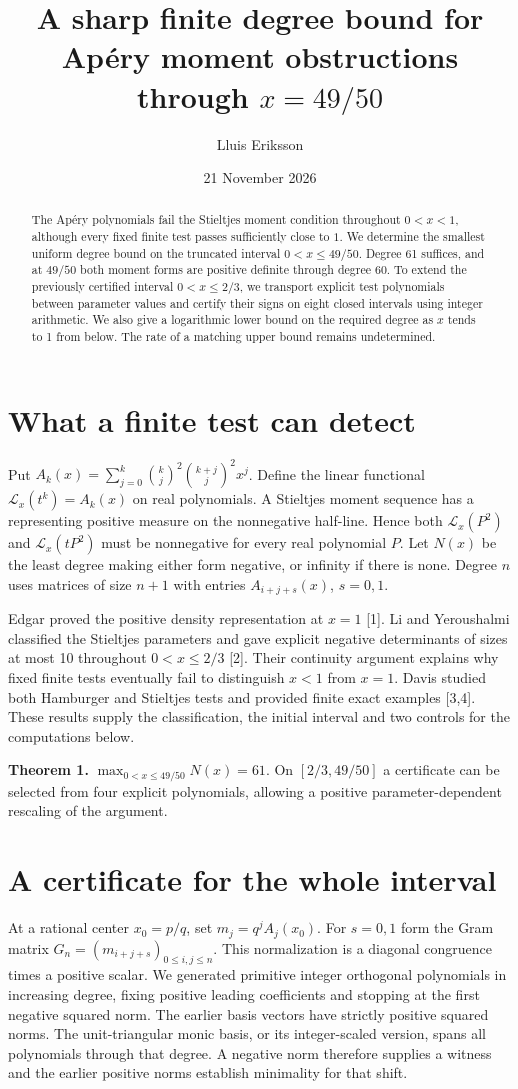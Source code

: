 \documentclass[11pt]{article}
\title{A sharp finite degree bound for Ap\'ery moment obstructions through \(x=49/50\)}
\author{Lluis Eriksson}
\date{21 November 2026}
\newcommand{\A}{A}\newcommand{\Lx}{\mathcal L_x}
\begin{document}
\maketitle
\begin{abstract}
The Ap\'ery polynomials fail the Stieltjes moment condition throughout \(0<x<1\), although every fixed finite test passes sufficiently close to \(1\). We determine the smallest uniform degree bound on the truncated interval \(0<x\le49/50\). Degree 61 suffices, and at \(49/50\) both moment forms are positive definite through degree 60. To extend the previously certified interval \(0<x\le2/3\), we transport explicit test polynomials between parameter values and certify their signs on eight closed intervals using integer arithmetic. We also give a logarithmic lower bound on the required degree as \(x\) tends to 1 from below. The rate of a matching upper bound remains undetermined.
\end{abstract}
\section{What a finite test can detect}
Put \(\A_k(x)=\sum_{j=0}^k {k\choose j}^2{k+j\choose j}^2 x^j\). Define the linear functional \(\Lx(t^k)=\A_k(x)\) on real polynomials. A Stieltjes moment sequence has a representing positive measure on the nonnegative half-line. Hence both \(\Lx(P^2)\) and \(\Lx(tP^2)\) must be nonnegative for every real polynomial \(P\). Let \(N(x)\) be the least degree making either form negative, or infinity if there is none. Degree \(n\) uses matrices of size \(n+1\) with entries \(\A_{i+j+s}(x)\), \(s=0,1\).

Edgar proved the positive density representation at \(x=1\) [1]. Li and Yeroushalmi classified the Stieltjes parameters and gave explicit negative determinants of sizes at most 10 throughout \(0<x\le2/3\) [2]. Their continuity argument explains why fixed finite tests eventually fail to distinguish \(x<1\) from \(x=1\). Davis studied both Hamburger and Stieltjes tests and provided finite exact examples [3,4]. These results supply the classification, the initial interval and two controls for the computations below.

\textbf{Theorem 1.} \(\max_{0<x\le49/50}N(x)=61\). On \([2/3,49/50]\) a certificate can be selected from four explicit polynomials, allowing a positive parameter-dependent rescaling of the argument.
\newpage
\section{A certificate for the whole interval}
At a rational center \(x_0=p/q\), set \(m_j=q^j\A_j(x_0)\). For \(s=0,1\) form the Gram matrix \(G_n=(m_{i+j+s})_{0\le i,j\le n}\). This normalization is a diagonal congruence times a positive scalar. We generated primitive integer orthogonal polynomials in increasing degree, fixing positive leading coefficients and stopping at the first negative squared norm. The earlier basis vectors have strictly positive squared norms. The unit-triangular monic basis, or its integer-scaled version, spans all polynomials through that degree. A negative norm therefore supplies a witness and the earlier positive norms establish minimality for that shift.
\end{document}
